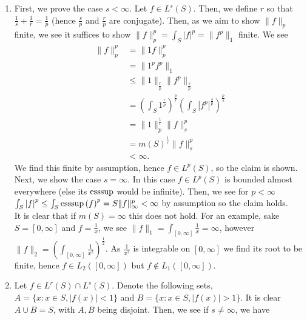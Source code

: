 \documentclass[a4paper]{article}
\begin{document}
\newpage
\begin{problem}[42]
\begin{enumerate}
	\item First, we prove the case \(s < \infty\). Let \(f \in L^{s}\left( S \right) \). Then, we define \(r\) so that \(\frac{1}{s} + \frac{1}{r} = \frac{1}{p}\) (hence \(\frac{s}{p}\) and \(\frac{r}{p}\) are conjugate). Then, as we aim to show \(\|f\|_{p}\) finite, we see it suffices to show \(\|f\|_{p}^{p} = \int_{S} \left| f \right| ^{p} = \| f^{p}\|_{1}\) finite. We see
		\begin{align*}
			\|f\|_{p}^{p} &= \| 1f\|_{p}^{p}\\
&= \| 1^{p} f^{p}\|_{1} \\
&\le \|1\|_{\frac{r}{p}} \|f^{p}\|_{\frac{s}{p}}\\
&= (\int_{S} 1^{\frac{r}{p}} )^{\frac{p}{r}} \left( \int_{S} \left| f^{p} \right| ^{\frac{s}{p}} \right) ^{\frac{p}{s}}  \\
&= \|1\|^{\frac{1}{r}}_{p} \|f\|_{s}^{p}\\
&= m\left( S \right) ^{\frac{1}{r}} \|f\|_{s}^{p} \\
&< \infty
		.\end{align*}
		We find this finite by assumption, hence \(f \in L^{p}\left( S \right) \), so the claim is shown. \\
		Next, we show the case \(s = \infty\). In this case \(f\in L^{p}\left( S \right) \) is bounded almost everywhere (else its \(\operatorname{esssup}\) would be infinite). Then, we see for \(p < \infty\) \(\int_{S} \left| f \right| ^{p} \le \int_{S}\operatorname{esssup}\left( f \right)^{p} = S \|f\|_{\infty}^{p} < \infty\) by assumption so the claim holds.\\
		It is clear that if \(m\left( S \right) = \infty\) this does not hold. For an example, sake \(S = \left[ 0, \infty \right] \) and \(f = \frac{1}{x}\), we see \(\|f\|_{1} = \int_{\left[ 0, \infty \right] } \frac{1}{x} = \infty\), however \(\|f\|_{2} = (\int_{\left[ 0, \infty \right] } \frac{1}{x^2})^{\frac{1}{2}}\). As \(\frac{1}{x^2}\) is integrable on \(\left[ 0, \infty \right] \) we find its root to be finite, hence \(f \in L_2\left( \left[ 0, \infty \right]  \right) \) but \(f \not\in L_1\left( \left[ 0, \infty \right]  \right) \).
	\item Let \(f \in L^{r}\left( S \right) \cap L^{s}\left( S \right) \). Denote the following sets, \(A = \{x  : x \in S, \left| f\left( x \right)  \right| < 1\} \) and \(B = \{x : x \in S, \left| f\left( x \right)  \right| > 1\} \). It is clear \(A \cup B = S\), with \(A, B\) being disjoint. Then, we see if \(s \neq \infty\), we have

\end{enumerate}
\end{problem}
\end{document}

